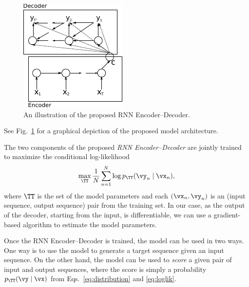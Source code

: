 \begin{figure}
    \centering
    \includegraphics[width=0.8\columnwidth]{figures/rnn_encdec.pdf}
    \caption{An illustration of the proposed RNN Encoder--Decoder.}
    \label{fig:encdec}
    \vspace{-3mm}
\end{figure}

See Fig.~\mbox{\ref{fig:encdec}} for a graphical depiction of the proposed
model architecture.

The two components of the proposed \textit{RNN Encoder--Decoder} are jointly
trained to maximize the conditional log-likelihood
\begin{align}
    \label{eq:loglik}
    \max_\TT \frac{1}{N} \sum_{n=1}^N \log p_{\TT}(\vy_n \mid \vx_n),
\end{align}
where $\TT$ is the set of the model parameters and each $\left(\vx_n,
\vy_n\right)$ is an (input sequence, output sequence) pair from the training set. 
In our case, as the
output of the decoder, starting from the input, is differentiable, we can use a
gradient-based algorithm to estimate the model parameters.

Once the RNN Encoder--Decoder is trained, the model can be used in two ways. One
way is to use the model to generate a target sequence given an input sequence.
On the other hand, the model can be used to \textit{score} a given pair of input
and output sequences, where the score is simply a probability $p_\TT(\vy \mid
\vx)$ from Eqs.~\eqref{eq:distribution} and \eqref{eq:loglik}. 

